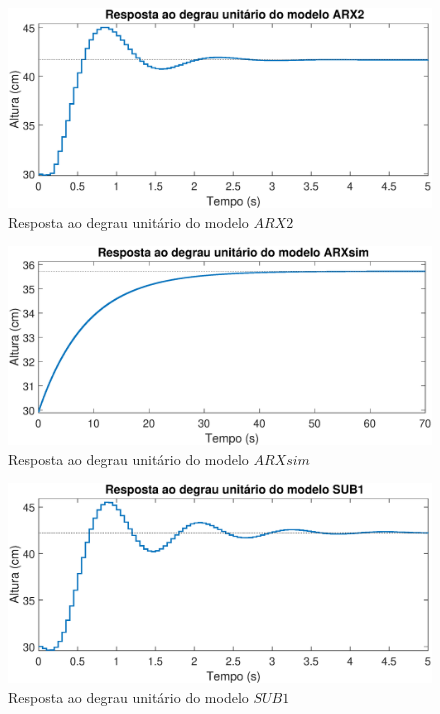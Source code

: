 \begin{figure}[H]
	\centering
	\includegraphics[width=1\linewidth]{respostadegrauarx2}
	\caption[Resposta ao degrau do modelo $ARX2$]{Resposta ao degrau unitário do modelo $ARX2$}
	\label{fig:respostadegrauarx2}
\end{figure}

\begin{figure}[H]
	\centering
	\includegraphics[width=1\linewidth]{respostadegrauarxsim}
	\caption[Resposta ao degrau do modelo $ARXsim$]{Resposta ao degrau unitário do modelo $ARXsim$}
	\label{fig:respostadegrauarxsim}
\end{figure}

\begin{figure}[H]
	\centering
	\includegraphics[width=1\linewidth]{respostadegrausub1}
	\caption[Resposta ao degrau do modelo $SUB1$]{Resposta ao degrau unitário do modelo $SUB1$}
	\label{fig:respostadegrausub}
\end{figure}


